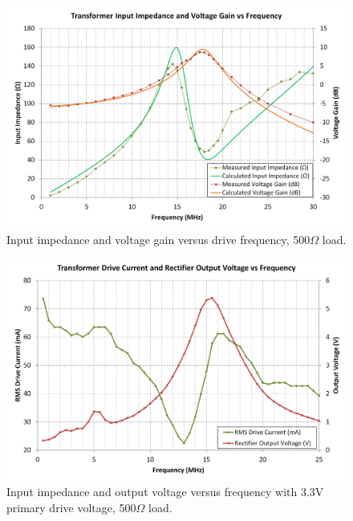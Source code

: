 \documentclass[conference]{IEEEtran}
\begin{document}
	\begin{figure}[t]
		\centering
		\includegraphics[width=1.0\columnwidth]{./img/NoRectTF}
		\caption{Input impedance and voltage gain versus drive frequency, 500$\Omega$ load.}
		\label{fig:NoRect}
	\end{figure}

	\begin{figure}[t]
		\centering
		\includegraphics[width=1\columnwidth]{./img/ZandVoutVsF_3V3}
		\caption{Input impedance and output voltage versus frequency with 3.3V primary drive voltage, 500$\Omega$ load.}
		\label{fig:ZandVvsF}
	\end{figure}
	
\end{document}
